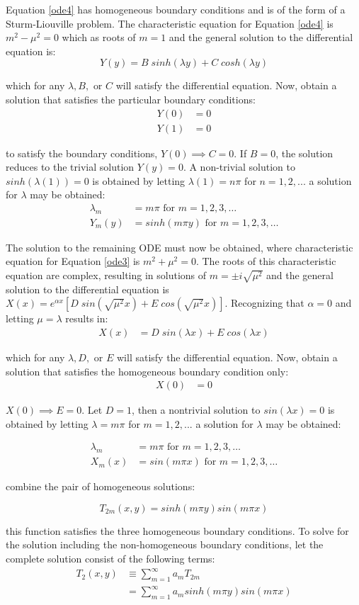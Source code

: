 \documentclass[letterpaper, 10pt, oneside]{article}
\newcommand{\as}[1]{\begin{align*}#1\end{align*}}
\newcommand{\an}[1]{\begin{align}#1\end{align}}
\begin{document}
	Equation \ref{ode4} has homogeneous boundary conditions and is of the form of a Sturm-Liouville problem. The characteristic equation for Equation \ref{ode4} is $m^2 - \mu^2 = 0$ which as roots of $m = 1$ and the general solution to the differential equation is:
	 $$Y(y) = B\; sinh(\lambda y) + C\; cosh(\lambda y) $$

	which  for any $\lambda, B, \text{ or } C$ will satisfy the differential equation. Now, obtain a solution that satisfies the particular boundary conditions:
	\as{Y(0)&=0 \\ Y(1)&=0}

	to satisfy the boundary conditions, $Y(0) \implies C = 0$. If $B=0$, the solution reduces to the trivial solution $Y(y)=0$. A non-trivial solution to $sinh(\lambda (1))=0$ is obtained by letting $\lambda (1)=n\pi$ for $ n=1,2,...$ a solution for $\lambda$ may be obtained:
	\an{\lambda_m &= m\pi \text{ for } m = 1,2,3,\ldots \\
	Y_m(y) &= sinh\left( m\pi y \right) \text{ for } m = 1,2,3,\ldots }

	 The solution to the remaining ODE must now be obtained, where characteristic equation for Equation \ref{ode3} is $m^2 + \mu^2 = 0$.  The roots of this characteristic equation are complex, resulting in solutions of $m = \pm i \sqrt{\mu^2}$ and the general solution to the differential equation is $X(x) = e^{\alpha x} \left[D\; sin(\sqrt{\mu^2} x) + E\; cos(\sqrt{\mu^2} x) \right]$. Recognizing that $\alpha = 0$ and letting $\mu = \lambda$ results in:
	\as{X(x) &= D\; sin(\lambda x) + E\; cos(\lambda x)} 

	 which  for any $\lambda, D, \text{ or } E$ will satisfy the differential equation. Now, obtain a solution that satisfies the homogeneous boundary condition only:
	\as{X(0)&=0}

	$X(0) \implies E = 0$. Let $D=1$, then a nontrivial solution to $sin(\lambda x)=0$ is obtained by letting $\lambda =m\pi$ for $ m=1,2,...$ a solution for $\lambda$ may be obtained:
	
	\an{\lambda_m &= m\pi \text{ for } m = 1,2,3,\ldots \\
	X_m(x) &= sin\left( m\pi x \right) \text{ for } m = 1,2,3,\ldots }

	combine the pair of homogeneous solutions:

	$$T_{2m}(x,y) = sinh\left( m\pi y \right) sin\left( m\pi x \right) $$

	this function satisfies the three homogeneous boundary conditions.  To solve for the solution including the non-homogeneous boundary conditions, let the complete solution consist of the following terms:
	\as{T_2(x,y) & \equiv \sum_{m=1}^\infty a_m T_{2m} \\
	 & = \sum_{m=1}^\infty a_m sinh\left( m\pi y \right) sin\left( m\pi x \right)}
\end{document}
